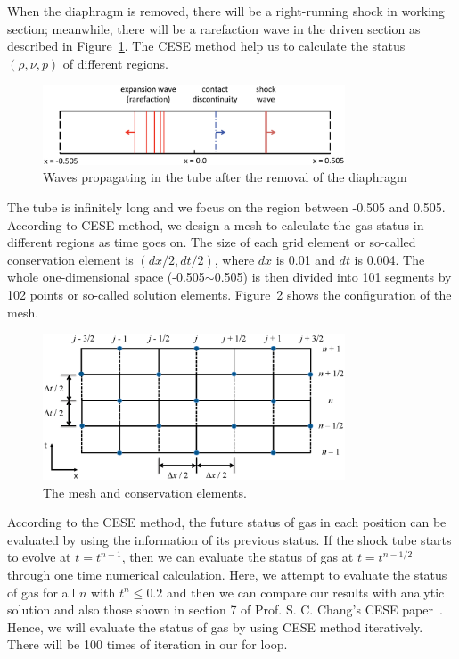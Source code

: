 \documentclass[a4paper,12pt]{article}
\begin{document}
When the diaphragm is removed, there will be a right-running shock in working 
section; meanwhile, there will be a rarefaction wave in the driven section as 
described in Figure~\ref{fig:sod_shock_tube_1D_no_diaphragm}. The CESE method 
help us to calculate the status $(\rho, \nu, p)$ of different regions.

 \begin{figure}[hbtp]
    \centering
     \includegraphics[width=0.8\textwidth]{sod_shock_tube_1D_no_diaphragm.eps}
     \caption{Waves propagating in the tube after the removal of the diaphragm}
     \label{fig:sod_shock_tube_1D_no_diaphragm}
 \end{figure}

The tube is infinitely long and we focus on the region between -0.505 and 0.505. 
According to CESE method, we design a mesh to calculate the gas status in 
different regions as time goes on. The size of each grid element or so-called 
conservation element is $(dx/2, dt/2)$, where $dx$ is 0.01 and $dt$ is 0.004. 
The whole one-dimensional space (-0.505$\sim$0.505) is then divided into 101 
segments by 102 points or so-called solution elements. 
Figure~\ref{fig:mesh_and_ce_v2} shows the configuration of the mesh. 

 \begin{figure}[ht]
    \centering
     \includegraphics[width=0.8\textwidth]{mesh_and_ce.eps}
     \caption{The mesh and conservation elements.}
     \label{fig:mesh_and_ce_v2}
 \end{figure}

According to the CESE method, the future status of gas in each position can be 
evaluated by using the information of its previous status. If the shock tube 
starts to evolve at $t=t^{n-1}$, then we can evaluate the status of gas at 
$t=t^{n-1/2}$ through one time numerical calculation. 
Here, we attempt to evaluate the status of gas for all $n$ with $t^{n}\leq0.2$ 
and then we can compare our results with analytic solution and also those shown 
in section 7 of Prof. S. C. Chang's CESE paper~\cite{CESE_Shin_Chung_Chang_1995}. 
Hence, we will evaluate the status of gas by using CESE method iteratively. 
There will be 100 times of iteration in our for loop.
\end{document}
